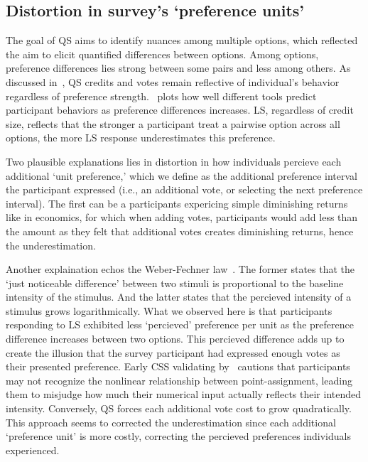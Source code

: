 \subsection{Distortion in survey's `preference units'}
The goal of QS aims to identify nuances among multiple options, which reflected the aim to elicit quantified differences between options. Among options, preference differences lies strong between some pairs and less among others. As discussed in~, QS credits and votes remain reflective of individual's behavior regardless of preference strength.~ plots how well different tools predict participant behaviors as preference differences increases. LS, regardless of credit size, reflects that the stronger a participant treat a pairwise option across all options, the more LS response underestimates this preference.

Two plausible explanations lies in distortion in how individuals percieve each additional `unit preference,' which we define as the additional preference interval the participant expressed (i.e., an additional vote, or selecting the next preference interval). The first can be a participants expericing simple diminishing returns~\cite{mankiwPrinciplesEconomics2018} like in economics, for which when adding votes, participants would add less than the amount as they felt that additional votes creates diminishing returns, hence the underestimation. 

Another explaination echos the Weber-Fechner law~\cite{}. The former states that the `just noticeable difference' between two stimuli is proportional to the baseline intensity of the stimulus. And the latter states that the percieved intensity of a stimulus grows logarithmically. What we observed here is that participants responding to LS exhibited less `percieved' preference per unit as the preference difference increases between two options. This percieved difference adds up to create the illusion that the survey participant had expressed enough votes as their presented preference. Early CSS validating by~\citet{dudekValidityPointAssignmentProcedure1957} cautions that participants may not recognize the nonlinear relationship between point-assignment, leading them to misjudge how much their numerical input actually reflects their intended intensity. Conversely, QS forces each additional vote cost to grow quadratically. This approach seems to corrected the underestimation since each additional `preference unit' is more costly, correcting the percieved preferences individuals experienced.

